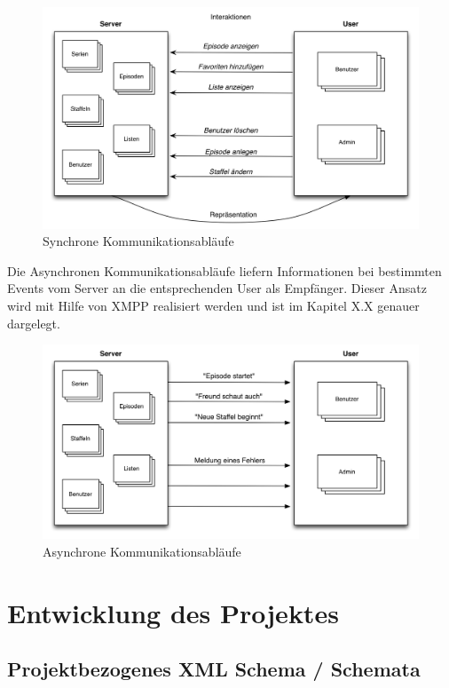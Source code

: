 \documentclass[a4paper]{article}
\begin{document}
\begin{figure}[H]
\includegraphics[width=1\textwidth]{images/kommunikationsablaeufe.png}
\caption{Synchrone Kommunikationsabläufe}
\label{kommunikationsablaeufe}
\end{figure}

Die Asynchronen Kommunikationsabläufe liefern Informationen bei bestimmten Events vom Server an die entsprechenden User als Empfänger. Dieser Ansatz wird mit Hilfe von XMPP realisiert werden und ist im Kapitel X.X genauer dargelegt. 

\begin{figure}[H]
\includegraphics[width=1\textwidth]{images/kommunikationsablaeufeAsynchron.png}
\caption{Asynchrone Kommunikationsabläufe}
\label{kommunikationsablaeufeAsynchron}
\end{figure}


\newpage

\section{Entwicklung des Projektes}

\subsection{Projektbezogenes XML Schema / Schemata}
\end{document}
